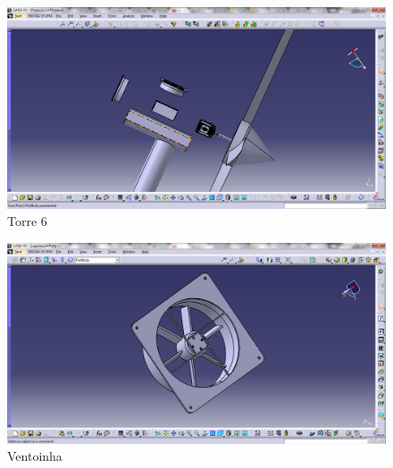 \begin{figure}[!htbp]
	  \centering
	  \includegraphics[scale=0.45]{editaveis/figuras/C_torre6}
	  \caption[Torre6]{Torre 6}
	  \label{Torre6}
	\end{figure}
	\FloatBarrier

\begin{figure}[!htbp]
	  \centering
	  \includegraphics[scale=0.45]{editaveis/figuras/C_Ventoinha}
	  \caption[Ventoinha]{Ventoinha}
	  \label{Torre6}
	\end{figure}
	\FloatBarrier
	